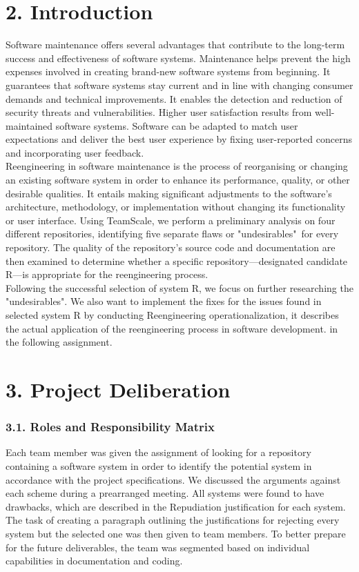 \documentclass[12pt,letterpaper]{report}
\begin{document}
\section*{2. Introduction}
\normalsize {Software maintenance offers several advantages that contribute to the long-term success and effectiveness of software systems. Maintenance helps prevent the high expenses involved in creating brand-new software systems from beginning. It guarantees that software systems stay current and in line with changing consumer demands and technical improvements. It enables the detection and reduction of security threats and vulnerabilities. Higher user satisfaction results from well-maintained software systems. Software can be adapted to match user expectations and deliver the best user experience by fixing user-reported concerns and incorporating user feedback.\\

Reengineering in software maintenance is the process of reorganising or changing an existing software system in order to enhance its performance, quality, or other desirable qualities. It entails making significant adjustments to the software's architecture, methodology, or implementation without changing its functionality or user interface. Using TeamScale, we perform a preliminary analysis on four different repositories, identifying five separate flaws or "undesirables" for every repository. The quality of the repository's source code and documentation are then examined to determine whether a specific repository—designated candidate R—is appropriate for the reengineering process. \\

Following the successful selection of system R, we focus on further researching the "undesirables". We also want to implement the fixes for the issues found in selected system R by conducting Reengineering operationalization, it describes the actual application of the reengineering process in software development. in the following assignment.}

\newpage
{}
\section*{3. Project Deliberation}
\subsubsection*{3.1. Roles and Responsibility Matrix}
\normalsize {Each team member was given the assignment of looking for a repository containing a software system in order to identify the potential system in accordance with the project specifications. We discussed the arguments against each scheme during a prearranged meeting. All systems were found to have drawbacks, which are described in the Repudiation justification for each system. The task of creating a paragraph outlining the justifications for rejecting every system but the selected one was then given to team members. To better prepare for the future deliverables, the team was segmented based on individual capabilities in documentation and coding.}
\end{document}
